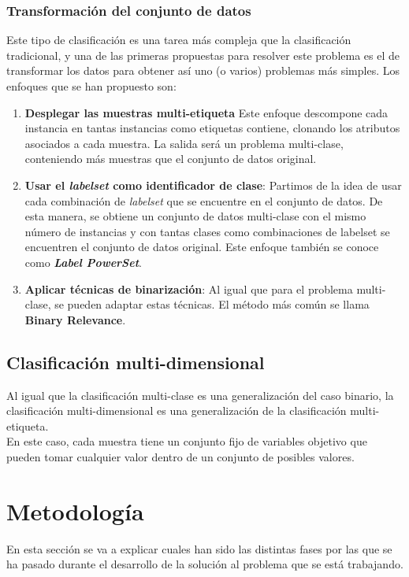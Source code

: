 \subsubsection*{Transformación del conjunto de datos}
Este tipo de clasificación es una tarea más compleja que la clasificación tradicional, y una de las primeras propuestas para resolver este problema es el de transformar los datos para obtener así uno (o varios) problemas más simples.
Los enfoques que se han propuesto son:
\begin{enumerate}
	\item \textbf{Desplegar las muestras multi-etiqueta} Este enfoque descompone cada instancia en tantas instancias como etiquetas contiene, clonando los atributos asociados a cada muestra. La salida será un problema multi-clase, conteniendo más muestras que el conjunto de datos original.
	\item \textbf{Usar el \textit{labelset} como identificador de clase}: Partimos de la idea de usar cada combinación de \textit{labelset} que se encuentre en el conjunto de datos. De esta manera, se obtiene un conjunto de datos multi-clase con el mismo número de instancias y con tantas clases como combinaciones de labelset se encuentren el conjunto de datos original. Este enfoque también se conoce como \textbf{\textit{Label PowerSet}}.
	\item \textbf{Aplicar técnicas de binarización}: Al igual que para el problema multi-clase, se pueden adaptar estas técnicas. El método más común se llama \textbf{Binary Relevance}.
\end{enumerate}
\subsection{Clasificación multi-dimensional}
Al igual que la clasificación multi-clase es una generalización del caso binario, la clasificación multi-dimensional es una generalización de la clasificación multi-etiqueta.\\
En este caso, cada muestra tiene un conjunto fijo de variables objetivo que pueden tomar cualquier valor dentro de un conjunto de posibles valores.
\pagebreak
\section{Metodología}
En esta sección se va a explicar cuales han sido las distintas fases por las que se ha pasado durante el desarrollo de la solución al problema que se está trabajando.
